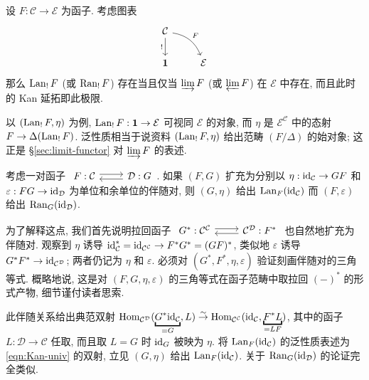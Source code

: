 \begin{example}\label{eg:limit-as-Kan}
	设 $F: \mathcal{C} \to \mathcal{E}$ 为函子. 考虑图表
	\[\begin{tikzcd}
		\mathcal{C} \arrow[d, "!"'] \arrow[rd, bend left, "F"] & \\
		\mathbf{1} & \mathcal{E}
	\end{tikzcd}\]
	那么 $\operatorname{Lan}_! F$ (或 $\operatorname{Ran}_! F$) 存在当且仅当 $\varinjlim F$ (或 $\varprojlim F$) 在 $\mathcal{E}$ 中存在, 而且此时的 Kan 延拓即此极限.

	以 $(\operatorname{Lan}_! F, \eta)$ 为例, $\operatorname{Lan}_! F: \mathbf{1} \to \mathcal{E}$ 可视同 $\mathcal{E}$ 的对象, 而 $\eta$ 是 $\mathcal{E}^{\mathcal{C}}$ 中的态射 $F \to \Delta(\operatorname{Lan}_! F)$. 泛性质相当于说资料 $(\operatorname{Lan}_! F, \eta)$ 给出范畴 $(F/\Delta)$ 的始对象; 这正是 \S\ref{sec:limit-functor} 对 $\varinjlim F$ 的表述.
\end{example}

\begin{example}
	考虑一对函子
	$\begin{tikzcd} F: \mathcal{C} \arrow[r, shift left] & \mathcal{D}: G \arrow[l, shift left] \end{tikzcd}$.
	如果 $(F, G)$ 扩充为分别以 $\eta: \mathrm{id}_{\mathcal{C}} \to GF$ 和 $\varepsilon: FG \to \mathrm{id}_{\mathcal{D}}$ 为单位和余单位的伴随对, 则 $(G, \eta)$ 给出 $\operatorname{Lan}_F (\mathrm{id}_{\mathcal{C}})$ 而 $(F, \varepsilon)$ 给出 $\operatorname{Ran}_G (\mathrm{id}_{\mathcal{D}})$.
	
	为了解释这点, 我们首先说明拉回函子
	$\begin{tikzcd} G^*: \mathcal{C}^{\mathcal{C}} \arrow[r, shift left] & \mathcal{C}^{\mathcal{D}}: F^* \arrow[l, shift left] \end{tikzcd}$
	也自然地扩充为伴随对. 观察到 $\eta$ 诱导 $\mathrm{id}_{\mathcal{C}}^* = \mathrm{id}_{\mathcal{C}^{\mathcal{C}}} \to F^* G^* = (GF)^*$, 类似地 $\varepsilon$ 诱导 $G^* F^* \to \mathrm{id}_{\mathcal{C}^{\mathcal{D}}}$; 两者仍记为 $\eta$ 和 $\varepsilon$. 必须对 $(G^*, F^*, \eta, \varepsilon)$ 验证刻画伴随对的三角等式. 概略地说, 这是对 $(F, G, \eta, \varepsilon)$ 的三角等式在函子范畴中取拉回 $(-)^*$ 的形式产物, 细节谨付读者思索.

	此伴随关系给出典范双射 $\Hom_{\mathcal{C}^{\mathcal{D}}}(\underbracket{G^* \identity_{\mathcal{C}}}_{= G}, L) \rightiso \Hom_{\mathcal{C}^{\mathcal{C}}}(\identity_{\mathcal{C}} , \underbracket{F^* L}_{=LF})$, 其中的函子 $L: \mathcal{D} \to \mathcal{C}$ 任取, 而且取 $L = G$ 时 $\mathrm{id}_G$ 被映为 $\eta$. 将 $\operatorname{Lan}_F (\mathrm{id}_{\mathcal{C}})$ 的泛性质表述为 \eqref{eqn:Kan-univ} 的双射, 立见 $(G, \eta)$ 给出 $\operatorname{Lan}_F (\mathrm{id}_{\mathcal{C}})$. 关于 $\operatorname{Ran}_G (\mathrm{id}_{\mathcal{D}})$ 的论证完全类似.
\end{example}

